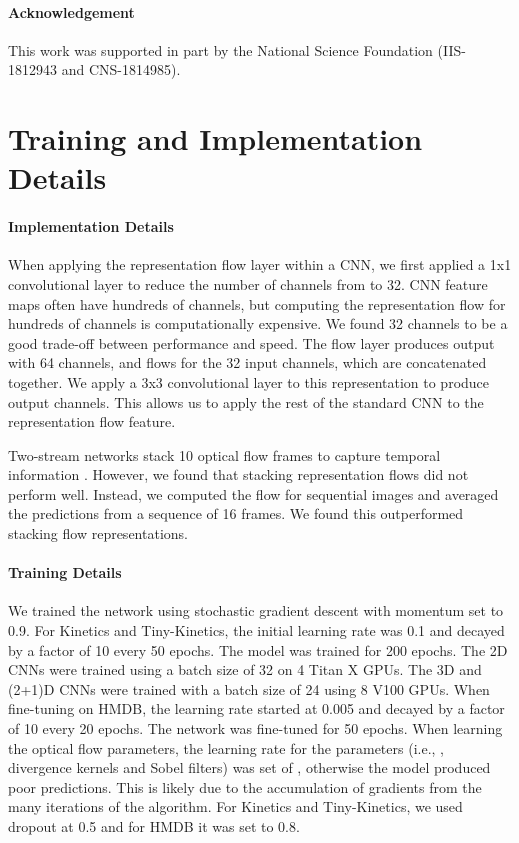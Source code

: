 \documentclass[10pt,twocolumn,letterpaper]{article}
\begin{document}
\paragraph{Acknowledgement} This work was supported in part by the National Science Foundation (IIS-1812943 and CNS-1814985).

{\small


}

\clearpage
\newpage
\appendix
\section{Training and Implementation Details}
\label{app:train}

\paragraph{Implementation Details} When applying the representation flow layer within a CNN, we first applied a 1x1 convolutional layer to reduce the number of channels from  to 32. CNN feature maps often have hundreds of channels, but computing the representation flow for hundreds of channels is computationally expensive. We found 32 channels to be a good trade-off between performance and speed. The flow layer produces output with 64 channels,  and  flows for the 32 input channels, which are concatenated together. We apply a 3x3 convolutional layer to this representation to produce  output channels. This allows us to apply the rest of the standard CNN to the representation flow feature.

Two-stream networks stack 10 optical flow frames to capture temporal information \cite{simonyan2014two}. However, we found that stacking representation flows did not perform well. Instead, we computed the flow for sequential images and averaged the predictions from a sequence of 16 frames. We found this outperformed stacking flow representations.

\paragraph{Training Details} We trained the network using stochastic gradient descent with momentum set to 0.9. For Kinetics and Tiny-Kinetics, the initial learning rate was 0.1 and decayed by a factor of 10 every 50 epochs. The model was trained for 200 epochs. The 2D CNNs were trained using a batch size of 32 on 4 Titan X GPUs. The 3D and (2+1)D CNNs were trained with a batch size of 24 using 8 V100 GPUs. When fine-tuning on HMDB, the learning rate started at 0.005 and decayed by a factor of 10 every 20 epochs. The network was fine-tuned for 50 epochs. When learning the optical flow parameters, the learning rate for the parameters (i.e., , divergence kernels and Sobel filters) was set of , otherwise the model produced poor predictions. This is likely due to the accumulation of gradients from the many iterations of the algorithm. For Kinetics and Tiny-Kinetics, we used dropout at 0.5 and for HMDB it was set to 0.8.
\end{document}
